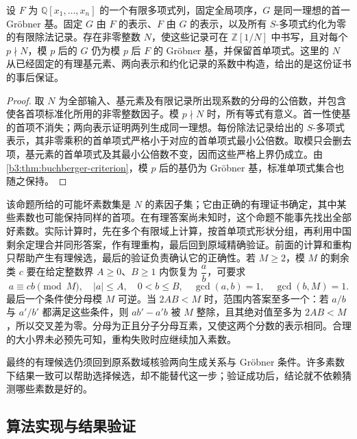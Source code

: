 \begin{proposition}[证书给出的有限坏素数集]\label{b3:prop:B-good-primes-certificate}
	设 \(F\) 为 \(\mathbb Q[x_1,\ldots,x_n]\) 的一个有限多项式列，固定全局项序，\(G\) 是同一理想的首一 Gröbner 基。固定 \(G\) 由 \(F\) 的表示、\(F\) 由 \(G\) 的表示，以及所有 \(S\)-多项式约化为零的有限除法记录。存在非零整数 \(N\)，使这些记录可在 \(\mathbb Z[1/N]\) 中书写，且对每个 \(p\nmid N\)，模 \(p\) 后的 \(G\) 仍为模 \(p\) 后 \(F\) 的 Gröbner 基，并保留首单项式。这里的 \(N\) 从已经固定的有理基元素、两向表示和约化记录的系数中构造，给出的是这份证书的事后保证。
\end{proposition}
\begin{proof}
	取 \(N\) 为全部输入、基元素及有限记录所出现系数的分母的公倍数，并包含使各首项标准化所用的非零整数因子。模 \(p\nmid N\) 时，所有等式有意义。首一性使基的首项不消失；两向表示证明两列生成同一理想。每份除法记录给出的 \(S\)-多项式表示，其非零乘积的首单项式严格小于对应的首单项式最小公倍数。取模只会删去项，基元素的首单项式及其最小公倍数不变，因而这些严格上界仍成立。由\cref{b3:thm:buchberger-criterion}，模 \(p\) 后的基仍为 Gröbner 基，标准单项式集合也随之保持。
\end{proof}

该命题所给的可能坏素数集是 \(N\) 的素因子集；它由正确的有理证书确定，其中某些素数也可能保持同样的首项。在有理答案尚未知时，这个命题不能事先找出全部好素数。实际计算时，先在多个有限域上计算，按首单项式形状分组，再利用中国剩余定理合并同形答案，作有理重构，最后回到原域精确验证。前面的计算和重构只帮助产生有理候选，最后的验证负责确认它的正确性。若 \(M\ge2\)，模 \(M\) 的剩余类 \(c\) 要在给定整数界 \(A\ge0\)、\(B\ge1\) 内恢复为 \(\dfrac ab\)，可要求
\[
	a\equiv cb\pmod M,\quad |a|\le A,\quad 0<b\le B,\quad \gcd(a,b)=1,\quad \gcd(b,M)=1.
\]
最后一个条件使分母模 \(M\) 可逆。当 \(2AB<M\) 时，范围内答案至多一个：若 \(a/b\) 与 \(a'/b'\) 都满足这些条件，则 \(ab'-a'b\) 被 \(M\) 整除，且其绝对值至多为 \(2AB<M\)，所以交叉差为零。分母为正且分子分母互素，又使这两个分数的表示相同。合理的大小界未必预先可知，重构失败时应继续加入素数。

\ProseParagraphBreak
最终的有理候选仍须回到原系数域核验两向生成关系与 Gröbner 条件。许多素数下结果一致可以帮助选择候选，却不能替代这一步；验证成功后，结论就不依赖猜测哪些素数是好的。

\subsection{算法实现与结果验证}
\label{b3:subsec:B02:04}

